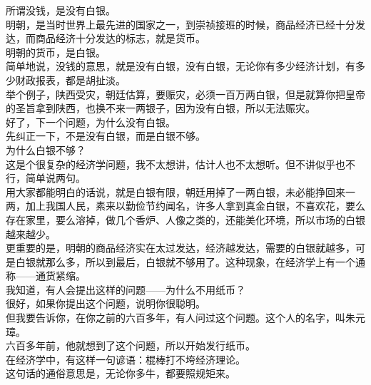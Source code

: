 \begin{multicols}{\theparacolNo}
所谓没钱，是没有白银。\\

明朝，是当时世界上最先进的国家之一，到崇祯接班的时候，商品经济已经十分发达，而商品经济十分发达的标志，就是货币。\\

明朝的货币，是白银。\\

简单地说，没钱的意思，就是没有白银，没有白银，无论你有多少经济计划，有多少财政报表，都是胡扯淡。\\

举个例子，陕西受灾，朝廷估算，要赈灾，必须一百万两白银，但是就算你把皇帝的圣旨拿到陕西，也换不来一两银子，因为没有白银，所以无法赈灾。\\

好了，下一个问题，为什么没有白银。\\

先纠正一下，不是没有白银，而是白银不够。\\

为什么白银不够？\\

这是个很复杂的经济学问题，我不太想讲，估计人也不太想听。但不讲似乎也不行，简单说两句。\\

用大家都能明白的话说，就是白银有限，朝廷用掉了一两白银，未必能挣回来一两，加上我国人民，素来以勤俭节约闻名，许多人拿到真金白银，不喜欢花，要么存在家里，要么溶掉，做几个香炉、人像之类的，还能美化环境，所以市场的白银越来越少。\\

更重要的是，明朝的商品经济实在太过发达，经济越发达，需要的白银就越多，可是白银就那么多，所以到最后，白银就不够用了。这种现象，在经济学上有一个通称——通货紧缩。\\

我知道，有人会提出这样的问题——为什么不用纸币？\\

很好，如果你提出这个问题，说明你很聪明。\\

但我要告诉你，在你之前的六百多年，有人问过这个问题。这个人的名字，叫朱元璋。\\

六百多年前，他就想到了这个问题，所以开始发行纸币。\\

在经济学中，有这样一句谚语：棍棒打不垮经济理论。\\

这句话的通俗意思是，无论你多牛，都要照规矩来。\\


\end{multicols}
